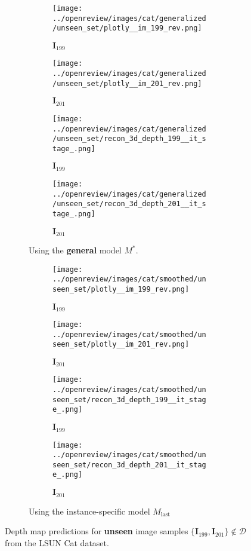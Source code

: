\begin{figure}[!htb]
\begin{subfigure}{\textwidth}
    

\begin{subfigure}{0.24\textwidth}
    \centering
    \texttt{[image: ../openreview/images/cat/generalized/unseen\_set/plotly\_\_im\_199\_rev.png]}
    \caption*{$\textbf{I}_{199}$}
\end{subfigure}
\begin{subfigure}{0.24\textwidth}
    \centering
    \texttt{[image: ../openreview/images/cat/generalized/unseen\_set/plotly\_\_im\_201\_rev.png]}
    \caption*{$\textbf{I}_{201}$}
\end{subfigure}
\begin{subfigure}{0.24\textwidth}
    \centering
    \texttt{[image: ../openreview/images/cat/generalized/unseen\_set/recon\_3d\_depth\_199\_\_it\_stage\_.png]}
    \caption*{$\textbf{I}_{199}$}
\end{subfigure}
\begin{subfigure}{0.24\textwidth}
    \centering
    \texttt{[image: ../openreview/images/cat/generalized/unseen\_set/recon\_3d\_depth\_201\_\_it\_stage\_.png]}
    \caption*{$\textbf{I}_{201}$}
\end{subfigure}
    \caption{Using the \textbf{general} model $M^*$.}
\end{subfigure}

\begin{subfigure}{\textwidth}
\begin{subfigure}{0.24\textwidth}
    \centering
    \texttt{[image: ../openreview/images/cat/smoothed/unseen\_set/plotly\_\_im\_199\_rev.png]}
    \caption*{$\textbf{I}_{199}$}
\end{subfigure}
\begin{subfigure}{0.24\textwidth}
    \centering
    \texttt{[image: ../openreview/images/cat/smoothed/unseen\_set/plotly\_\_im\_201\_rev.png]}
    \caption*{$\textbf{I}_{201}$}
\end{subfigure}
\begin{subfigure}{0.24\textwidth}
    \centering
    \texttt{[image: ../openreview/images/cat/smoothed/unseen\_set/recon\_3d\_depth\_199\_\_it\_stage\_.png]}
    \caption*{$\textbf{I}_{199}$}
\end{subfigure}
\begin{subfigure}{0.24\textwidth}
    \centering
    \texttt{[image: ../openreview/images/cat/smoothed/unseen\_set/recon\_3d\_depth\_201\_\_it\_stage\_.png]}
    \caption*{$\textbf{I}_{201}$}
\end{subfigure}
\caption{Using the instance-specific model $M_{\textrm{last}}$}
\end{subfigure}
    \caption{Depth map predictions for \textbf{unseen} image samples $\{\textbf{I}_{199}, \textbf{I}_{201} \} \not\in \mathcal{D}$ from the LSUN Cat dataset.}
    \label{fig:gen_LSUN_Cat_test}
\end{figure}

